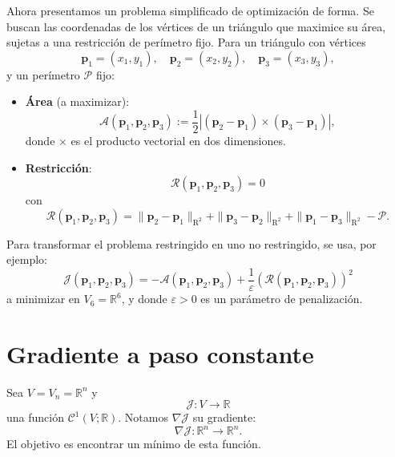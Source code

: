\documentclass[12pt]{book}
\theoremstyle{definition}
\theoremstyle{plain}
\theoremstyle{remark}
\begin{document}
Ahora presentamos un problema simplificado de optimización de forma.
Se buscan las coordenadas de los vértices de un triángulo que maximice su área, sujetas a una restricción de perímetro fijo. 
%
Para un triángulo con vértices 
\[ \mathbf{p}_1 = (x_1, y_1), \quad \mathbf{p}_2 = (x_2, y_2), \quad \mathbf{p}_3 = (x_3, y_3),\] y un perímetro $ \mathcal{P} $ fijo:
\begin{itemize}
    \item \textbf{Área} (a maximizar):
    \[
    \mathcal{A}(\mathbf{p}_1, \mathbf{p}_2, \mathbf{p}_3) := \frac{1}{2} |  (\mathbf{p}_2 - \mathbf{p}_1) \times (\mathbf{p}_3 - \mathbf{p}_1) |, 
    \]
    donde $\times$ es el producto vectorial en dos dimensiones.
    \item \textbf{Restricción}:
    \[
    \mathcal{R}(
    \mathbf{p}_1 ,
    \mathbf{p}_2 ,
    \mathbf{p}_3 ) = 0
    \]
    con 
    \[
    \mathcal{R}(
    \mathbf{p}_1 ,
    \mathbf{p}_2 ,
    \mathbf{p}_3 ) = 
    \| \mathbf{p}_2 - \mathbf{p}_1 \|_{\mathrm{R}^2}
    + 
    \|
    \mathbf{p}_3 - \mathbf{p}_2 
    \|_{\mathrm{R}^2}
    + \| \mathbf{p}_1 - \mathbf{p}_3 
    \|_{\mathrm{R}^2}
    - \mathcal{P}. \]
\end{itemize}
%
Para transformar el problema restringido en uno no restringido, se usa, por ejemplo:
$$
\mathcal{J}(\mathbf{p}_1, \mathbf{p}_2, \mathbf{p}_3) = -\mathcal{A}(\mathbf{p}_1, \mathbf{p}_2, \mathbf{p}_3) + 
\frac{1}{\varepsilon} \left (
    \mathcal{R}(
    \mathbf{p}_1 ,
    \mathbf{p}_2 ,
    \mathbf{p}_3 ) \right )^2
$$
a minimizar en $V_6 = \mathbb{R}^6$, y
donde $ \varepsilon > 0 $ es un parámetro de penalización.

\section{Gradiente a paso constante}

Sea $V = V_n = \mathbb{R}^n$ y
\[
\mathcal{J} : V \rightarrow \mathbb{R}
\]
una funci\'on $\mathscr{C}^1(V;\mathbb{R})$. Notamos $\nabla \mathcal{J}$ su gradiente:
\[
\nabla \mathcal{J} :
\mathbb{R}^n \rightarrow \mathbb{R}^n.
\]
El objetivo es encontrar un mínimo %
de esta función. %
\end{document}

